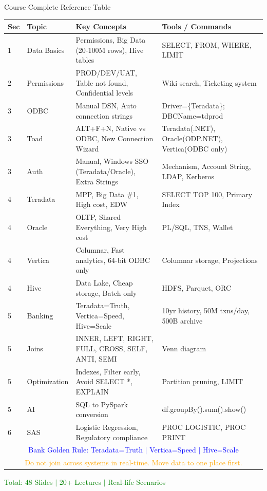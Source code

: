\documentclass{beamer}
\begin{document}
	
	\begin{frame}{Course Complete Reference Table}
		\tiny
		\begin{tabular}{|p{}|p{}|p{}|p{}|}
			\hline
			\textbf{Sec} & \textbf{Topic} & \textbf{Key Concepts} & \textbf{Tools / Commands} \\
			\hline
			1 & Data Basics & Permissions, Big Data (20-100M rows), Hive tables & SELECT, FROM, WHERE, LIMIT \\
			\hline
			2 & Permissions & PROD/DEV/UAT, Table not found, Confidential levels & Wiki search, Ticketing system \\
			\hline
			3 & ODBC & Manual DSN, Auto connection strings & Driver=\{Teradata\}; DBCName=tdprod \\
			\hline
			3 & Toad & ALT+F+N, Native vs ODBC, New Connection Wizard & Teradata(.NET), Oracle(ODP.NET), Vertica(ODBC only) \\
			\hline
			3 & Auth & Manual, Windows SSO (Teradata/Oracle), Extra Strings & Mechanism, Account String, LDAP, Kerberos \\
			\hline
			4 & Teradata & MPP, Big Data \#1, High cost, EDW & SELECT TOP 100, Primary Index \\
			\hline
			4 & Oracle & OLTP, Shared Everything, Very High cost & PL/SQL, TNS, Wallet \\
			\hline
			4 & Vertica & Columnar, Fast analytics, 64-bit ODBC only & Columnar storage, Projections \\
			\hline
			4 & Hive & Data Lake, Cheap storage, Batch only & HDFS, Parquet, ORC \\
			\hline
			5 & Banking & Teradata=Truth, Vertica=Speed, Hive=Scale & 10yr history, 50M txns/day, 500B archive \\
			\hline
			5 & Joins & INNER, LEFT, RIGHT, FULL, CROSS, SELF, ANTI, SEMI & Venn diagram \\
			\hline
			5 & Optimization & Indexes, Filter early, Avoid SELECT *, EXPLAIN & Partition pruning, LIMIT \\
			\hline
			5 & AI & SQL to PySpark conversion & df.groupBy().sum().show() \\
			\hline
			6 & SAS & Logistic Regression, Regulatory compliance & PROC LOGISTIC, PROC PRINT \\
			\hline
			\multicolumn{4}{|c|}{\textcolor{blue}{Bank Golden Rule: Teradata=Truth $\vert$ Vertica=Speed $\vert$ Hive=Scale}} \\
			\hline
			\multicolumn{4}{|c|}{\textcolor{orange}{Do not join across systems in real-time. Move data to one place first.}} \\
			\hline
		\end{tabular}
		
		\vspace{0.2cm}
		\begin{center}
			\textcolor{green}{\tiny Total: 48 Slides $\vert$ 20+ Lectures $\vert$ Real-life Scenarios}
		\end{center}
	\end{frame}
	
\end{document}
